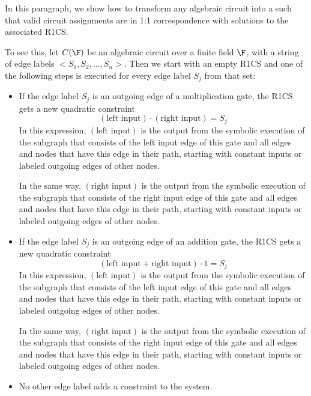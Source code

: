 In this paragraph, we show how to transform any algebraic circuit into a  such that valid circuit assignments are in 1:1 correspondence with solutions to the associated R1CS. 

To see this, let $C(\F)$ be an algebraic circuit over a finite field $\F$, with a string of edge labels $<S_1,S_2,\ldots, S_n>$. Then we start with an empty R1CS and one of the following steps is executed for every edge label $S_j$ from that set:
\begin{itemize}
\label{algebraic-gates}
\item If the edge label $S_j$ is an outgoing edge of a multiplication gate, the R1CS gets a new quadratic constraint
\begin{equation}
(\text{left input})\cdot (\text{right input}) = S_j
\end{equation} 
In this expression, $(\text{left input})$ is the output from the symbolic execution of the subgraph that consists of the left input edge of this gate and all edges and nodes that have  this edge in their path, starting with constant inputs or labeled outgoing edges of other nodes. 

In the same way, $(\text{right input})$ is the output from the symbolic execution of the subgraph that consists of the right input edge of this gate and all edges and nodes that have this edge in their path, starting with constant inputs or labeled outgoing edges of other nodes.
\item If the edge label $S_j$ is an outgoing edge of an addition gate, the R1CS gets a new quadratic constraint
\begin{equation}
(\text{left input} + \text{right input})\cdot 1 = S_j
\end{equation}  
In this expression, $(\text{left input})$ is the output from the symbolic execution of the subgraph that consists of the left input edge of this gate and all edges and nodes that have  this edge in their path, starting with constant inputs or labeled outgoing edges of other nodes. 

In the same way, $(\text{right input})$ is the output from the symbolic execution of the subgraph that consists of the right input edge of this gate and all edges and nodes that have this edge in their path, starting with constant inputs or labeled outgoing edges of other nodes.
\item No other edge label adds a constraint to the system.
\end{itemize}

